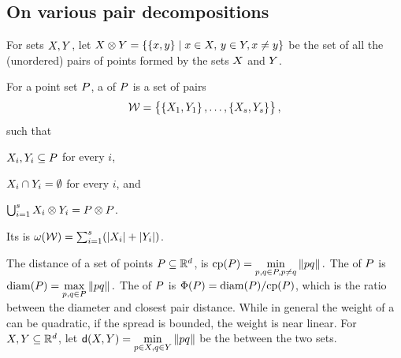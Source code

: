 \documentclass[12pt]{article}%
\begin{document}
\subsection{On various pair decompositions}

For sets $X, Y$, let
\begin{math}
    \PSX \otimes \PSY%
    =%
    \Set{\brc{\px,\py}}{ \px\in \PSX,\, \py\in \PSY, \px \ne \py }
\end{math}
be the set of all the (unordered) pairs of points formed by the sets
$X$ and $Y$.

\begin{defn}
    For a point set $P$, a  of $P$ is a set of pairs
    \begin{equation*}
        \mathcal{W} = \left\{ {\bigl. \left\{ {X_1,Y_1} \right\},\ldots,\left\{ {X_s,Y_s} \right\}} \right\},
    \end{equation*}
    such that
    \begin{enumerate*}[label=(\Roman*)]
        \item $X_i,Y_i\subseteq P$ for every $i$,
        \item $X_i \cap Y_i = \emptyset$ for every $i$, and
        \item
        $\bigcup_{i=1}^s X_i \otimes Y_i = P \otimes P$.
    \end{enumerate*}
    Its  is
    $\WeightX{\WS} = \sum_{i=1}^s \pth{ \cardin{\PSX_i } +
       \cardin{\PSY_i}}$.
\end{defn}

The  distance of a set of points
$P \subseteq \mathbb{R}^d$, is
\begin{math}
    \cpX{\PS} = \underset{\pa, \pb \in \PS, \pa \neq \pb}{\min}
    \dY{\pa}{\pb}.
\end{math}
The  of $P$ is
\begin{math}
    \diamX{\PS} = \underset{\pa, \pb \in \PS}{\max}\dY{\pa}{\pb}.
\end{math}
The  of $P$ is
$\spreadX{\PS} = \diamX{\PS} / \cpX{\PS}$, which is the ratio between
the diameter and closest pair distance.  While in general the weight
of a \WSPD can be quadratic, if the spread is bounded, the weight is
near linear.  For $X, Y \subseteq \mathbb{R}^d$, let
$\dsY{\PSX}{\PSY} = \underset{\pa \in \PSX, \pb \in \PSY}{\min}
\dY{\pa}{\pb}$ be the  between the two sets.
\end{document}

